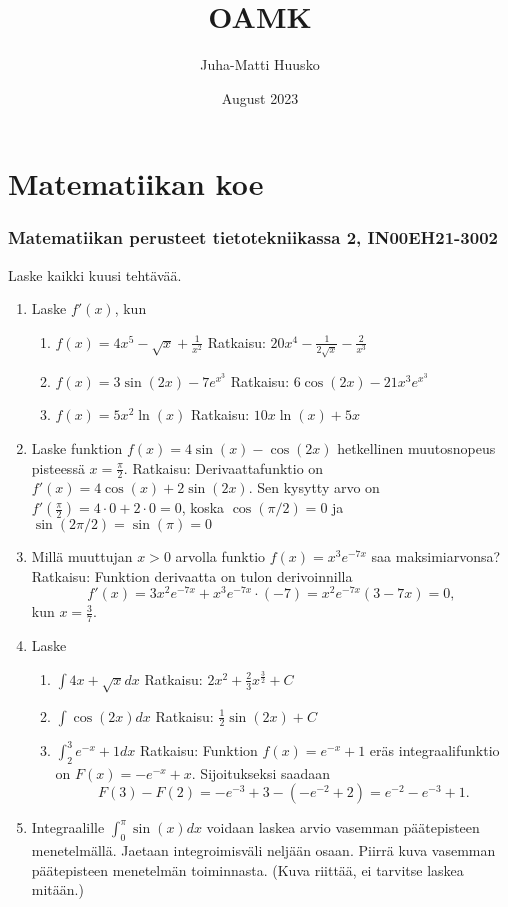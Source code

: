 \documentclass[12pt]{article}
\title{OAMK}
\author{Juha-Matti Huusko}
\date{August 2023}
\renewcommand{\ratkaisu}[1]{{\color{blue}\quad\textrm{Ratkaisu: } #1}}
\begin{document}
\thispagestyle{empty}

\section*{Matematiikan koe}
\subsubsection*{Matematiikan perusteet tietotekniikassa 2, IN00EH21-3002}

Laske kaikki kuusi tehtävää.

\begin{enumerate}
\item Laske $f'(x)$, kun
\begin{enumerate}
\item $f(x)=4x^5-\sqrt{x}+\frac{1}{x^2}$
\ratkaisu{$20x^4-\frac{1}{2\sqrt{x}}-\frac{2}{x^3}$}
\item $f(x)=3\sin(2x)-7e^{x^3}$
\ratkaisu{$6\cos(2x)-21x^3e^{x^3}$}
\item $f(x)=5x^2\ln(x)$
\ratkaisu{$10x\ln(x)+5x$}
\end{enumerate}
\item Laske funktion $f(x)=4\sin(x)-\cos(2x)$ hetkellinen muutosnopeus pisteessä $x=\frac{\pi}{2}$.
\ratkaisu{Derivaattafunktio on $f'(x)=4\cos(x)+2\sin(2x)$. Sen kysytty arvo on $f'(\frac{\pi}{2})=4\cdot 0+2\cdot 0=0$, koska $\cos(\pi/2)=0$ ja $\sin(2\pi/2)=\sin(\pi)=0$}
\item Millä muuttujan \(x>0\) arvolla funktio \(f(x)=x^3e^{-7x}\) saa maksimiarvonsa?
\ratkaisu{Funktion derivaatta on tulon derivoinnilla
$$
f'(x)=3x^2e^{-7x}+x^3e^{-7x}\cdot (-7)
=x^2e^{-7x}(3-7x)=0,
$$
kun $x=\frac37$.
}
\item Laske
\begin{enumerate}
\item $\int 4x+\sqrt{x}dx$
\ratkaisu{$2x^2+\frac23 x^{\frac32}+C$}
\item $\int \cos(2x)dx$
\ratkaisu{$\frac12\sin(2x)+C$}
\item $\int_2^3 e^{-x}+1dx$
\ratkaisu{Funktion $f(x)=e^{-x}+1$ eräs integraalifunktio on $F(x)=-e^{-x}+x$. Sijoitukseksi saadaan
$$
F(3)-F(2)=-e^{-3}+3-(-e^{-2}+2)=e^{-2}-e^{-3}+1.
$$}
\end{enumerate}

\item Integraalille $\int_0^\pi \sin(x)dx$ voidaan laskea arvio vasemman päätepisteen menetelmällä. Jaetaan integroimisväli neljään osaan. Piirrä kuva vasemman päätepisteen menetelmän toiminnasta. (Kuva riittää, ei tarvitse laskea mitään.)


\end{enumerate}
\end{document}
